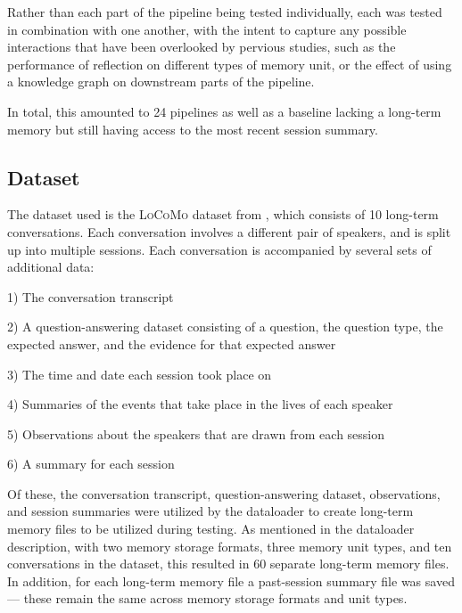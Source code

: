 \noindent Rather than each part of the pipeline being tested individually, each was tested in combination with one another, with the intent to capture any possible interactions that have been overlooked by pervious studies, such as the performance of reflection on different types of memory unit, or the effect of using a knowledge graph on downstream parts of the pipeline.

In total, this amounted to 24 pipelines as well as a baseline lacking a long-term memory but still having access to the most recent session summary.



\subsection{Dataset}

The dataset used is the \textsc{LoCoMo} dataset from \cite{Maharana2024}, which consists of 10 long-term conversations. Each conversation involves a different pair of speakers, and is split up into multiple sessions. Each conversation is accompanied by several sets of additional data: 

\begin{displayquote}
1) The conversation transcript

2) A question-answering dataset consisting of a question, the question type, the expected answer, and the evidence for that expected answer

3) The time and date each session took place on

4) Summaries of the events that take place in the lives of each speaker

5) Observations about the speakers that are drawn from each session

6) A summary for each session
\end{displayquote}

\noindent Of these, the conversation transcript, question-answering dataset, observations, and session summaries were utilized by the dataloader to create long-term memory files to be utilized during testing. As mentioned in the dataloader description, with two memory storage formats, three memory unit types, and ten conversations in the dataset, this resulted in 60 separate long-term memory files. In addition, for each long-term memory file a past-session summary file was saved — these remain the same across memory storage formats and unit types.


